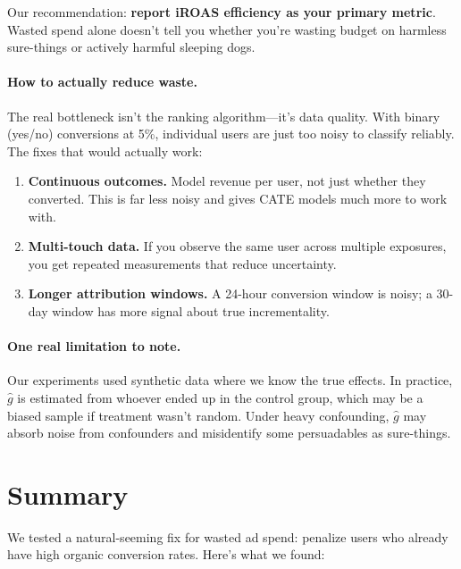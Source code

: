 \documentclass[10pt]{article}
\begin{document}
Our recommendation: \textbf{report iROAS efficiency as your primary metric}.
Wasted spend alone doesn't tell you whether you're wasting budget on harmless
sure-things or actively harmful sleeping dogs.

\paragraph{How to actually reduce waste.}
The real bottleneck isn't the ranking algorithm---it's data quality.
With binary (yes/no) conversions at 5\%, individual users are just too noisy
to classify reliably.  The fixes that would actually work:
\begin{enumerate}[topsep=2pt,itemsep=1pt]
  \item \textbf{Continuous outcomes.}  Model revenue per user, not just
    whether they converted.  This is far less noisy and gives CATE models
    much more to work with.
  \item \textbf{Multi-touch data.}  If you observe the same user across
    multiple exposures, you get repeated measurements that reduce uncertainty.
  \item \textbf{Longer attribution windows.}  A 24-hour conversion window
    is noisy; a 30-day window has more signal about true incrementality.
\end{enumerate}

\paragraph{One real limitation to note.}
Our experiments used synthetic data where we know the true effects.
In practice, $\hat{g}$ is estimated from whoever ended up in the control
group, which may be a biased sample if treatment wasn't random.  Under
heavy confounding, $\hat{g}$ may absorb noise from confounders and
misidentify some persuadables as sure-things.

\section{Summary}
\label{sec:conclusion}

We tested a natural-seeming fix for wasted ad spend: penalize users who
already have high organic conversion rates.  Here's what we found:
\end{document}
